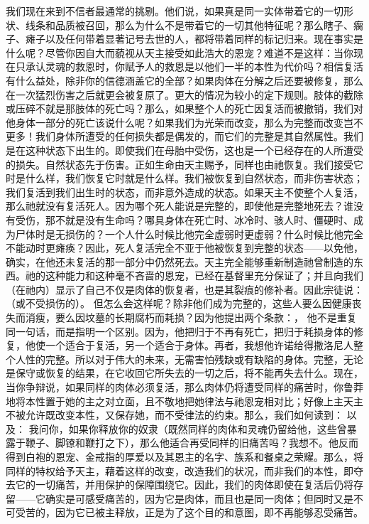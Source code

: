 我们现在来到不信者最通常的挑剔。他们说，如果真是同一实体带着它的一切形状、线条和品质被召回，那么为什么不是带着它的一切其他特征呢？那么瞎子、瘸子、瘫子以及任何带着显著记号去世的人，都将带着同样的标记归来。现在事实是什么呢？尽管你因自大而藐视从天主接受如此浩大的恩宠？难道不是这样：当你现在只承认灵魂的救恩时，你赋予人的救恩是以他们一半的本性为代价吗？相信复活有什么益处，除非你的信德涵盖它的全部？如果肉体在分解之后还要被修复，那么在一次猛烈伤害之后就更会被复原了。更大的情况为较小的定下规则。肢体的截除或压碎不就是那肢体的死亡吗？那么，如果整个人的死亡因复活而被撤销，我们对他身体一部分的死亡该说什么呢？如果我们为光荣而改变，那么为完整而改变岂不更多！我们身体所遭受的任何损失都是偶发的，而它们的完整是其自然属性。我们是在这种状态下出生的。即使我们在母胎中受伤，这也是一个已经存在的人所遭受的损失。自然状态先于伤害。正如生命由天主赐予，同样也由祂恢复。我们接受它时是什么样，我们恢复它时就是什么样。我们被恢复到自然状态，而非伤害状态；我们复活到我们出生时的状态，而非意外造成的状态。如果天主不使整个人复活，那么祂就没有复活死人。因为哪个死人能说是完整的，即使他是完整地死去？谁没有受伤，那不就是没有生命吗？哪具身体在死亡时、冰冷时、骇人时、僵硬时、成为尸体时是无损伤的？一个人什么时候比他完全虚弱时更虚弱？什么时候比他完全不能动时更瘫痪？因此，死人复活完全不亚于他被恢复到完整的状态——以免他，确实，在他还未复活的那一部分中仍然死去。天主完全能够重新制造祂曾制造的东西。祂的这种能力和这种毫不吝啬的恩宠，已经在基督里充分保证了；并且向我们（在祂内）显示了自己不仅是肉体的恢复者，也是其裂痕的修补者。因此宗徒说：（或不受损伤的）。 但怎么会这样呢？除非他们成为完整的，这些人要么因健康丧失而消瘦，要么因坟墓的长期腐朽而耗损？因为他提出两个条款：， 他不是重复同一句话，而是指明一个区别。因为，他把归于不再有死亡，把归于耗损身体的修复，他使一个适合于复活，另一个适合于身体。再者，我想他许诺给得撒洛尼人整个人性的完整。所以对于伟大的未来，无需害怕残缺或有缺陷的身体。完整，无论是保守或恢复的结果，在它收回它所失去的一切之后，将不能再失去什么。现在，当你争辩说，如果同样的肉体必须复活，那么肉体仍将遭受同样的痛苦时，你鲁莽地将本性置于她的主之对立面，且不敬地把她律法与祂恩宠相对比；好像上主天主不被允许既改变本性，又保存她，而不受律法的约束。那么，我们如何读到：  以及：  我问你，如果你释放你的奴隶（既然同样的肉体和灵魂仍留给他，这些曾暴露于鞭子、脚镣和鞭打之下），那么他适合再受同样的旧痛苦吗？我想不。他反而得到白袍的恩宠、金戒指的厚爱以及其恩主的名字、族系和餐桌之荣耀。那么，将同样的特权给予天主，藉着这样的改变，改造我们的状况，而非我们的本性，即夺去它的一切痛苦，并用保护的保障围绕它。因此，我们的肉体即使在复活后仍将存留——它确实是可感受痛苦的，因为它是肉体，而且也是同一肉体；但同时又是不可受苦的，因为它已被主释放，正是为了这个目的和意图，即不再能够忍受痛苦。\par

